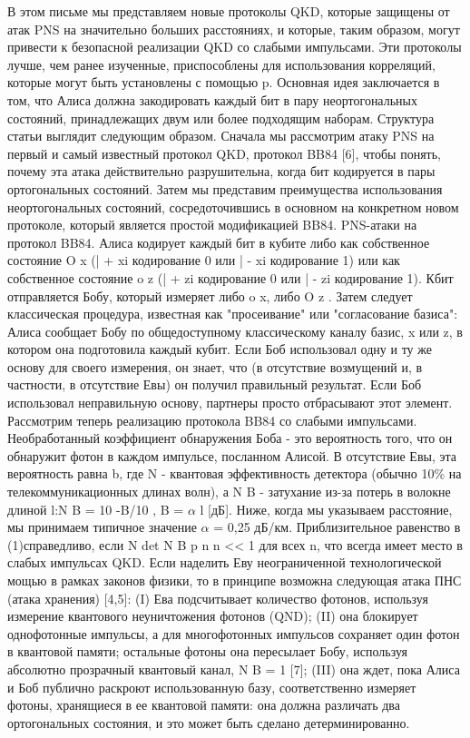В этом письме мы представляем новые протоколы QKD, которые защищены от атак PNS на значительно больших расстояниях, и которые, таким образом, могут привести к безопасной реализации QKD со слабыми импульсами. Эти протоколы лучше, чем ранее изученные, приспособлены для использования корреляций, которые могут быть установлены с помощью p. Основная идея заключается в том, что Алиса должна закодировать каждый бит в пару неортогональных состояний, принадлежащих двум или более подходящим наборам.
Структура статьи выглядит следующим образом. Сначала мы рассмотрим атаку PNS на первый и самый известный протокол QKD, протокол BB84 [6], чтобы понять, почему эта атака действительно разрушительна, когда бит кодируется в пары ортогональных состояний. Затем мы представим преимущества использования неортогональных состояний, сосредоточившись в основном на конкретном новом протоколе, который является простой модификацией BB84.
PNS-атаки на протокол BB84. Алиса кодирует каждый бит в кубите либо как собственное состояние O x (| + xi кодирование
0 или | - xi кодирование 1) или как собственное состояние o z (| + zi кодирование 0 или | - zi кодирование 1). Кбит отправляется Бобу, который измеряет либо o x, либо O z . Затем следует классическая процедура, известная как "просеивание" или "согласование базиса": Алиса сообщает Бобу по общедоступному классическому каналу базис, x или z, в котором она подготовила каждый кубит.
Если Боб использовал одну и ту же основу для своего измерения, он знает, что (в отсутствие возмущений и, в частности, в отсутствие Евы) он получил правильный результат. Если Боб использовал неправильную основу, партнеры просто отбрасывают этот элемент.
Рассмотрим теперь реализацию протокола BB84 со слабыми импульсами. Необработанный коэффициент обнаружения Боба - это вероятность того, что он обнаружит фотон в каждом импульсе, посланном Алисой. В отсутствие Евы, эта вероятность равна b, где N - квантовая эффективность детектора (обычно 10\% на телекоммуникационных длинах волн), а N B - затухание из-за потерь в волокне длиной l:N B = 10 -B/10 , B = $\alpha$ l [дБ]. Ниже, когда мы указываем расстояние, мы принимаем типичное значение $\alpha$ = 0,25 дБ/км. Приблизительное равенство в (1)справедливо, если N det N B p n n << 1 для всех n, что всегда имеет место в слабых импульсах QKD.
Если наделить Еву неограниченной технологической мощью в рамках законов физики, то в принципе возможна следующая атака ПНС (атака хранения) [4,5]: (I) Ева подсчитывает количество фотонов, используя измерение квантового неуничтожения фотонов (QND); (II) она блокирует однофотонные импульсы, а для многофотонных импульсов сохраняет один фотон в квантовой памяти; остальные фотоны она пересылает Бобу, используя абсолютно прозрачный квантовый канал, N B = 1 [7]; (III) она ждет, пока Алиса и Боб публично раскроют использованную базу, соответственно измеряет фотоны, хранящиеся в ее квантовой памяти: она должна различать два ортогональных состояния, и это может быть сделано детерминированно.
